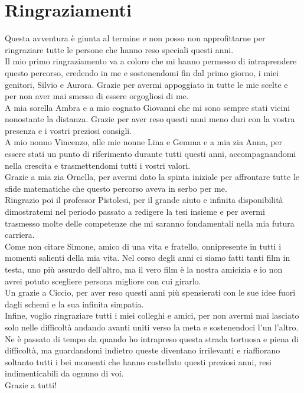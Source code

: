 \documentclass[a4paper,11pt]{article}
\begin{document}
    \section{Ringraziamenti}
    Questa avventura è giunta al termine e non posso non approfittarne per ringraziare tutte le persone che hanno reso speciali questi anni.\\[0.1in]
    Il mio primo ringraziamento va a coloro che mi hanno permesso di intraprendere questo percorso, credendo in me e sostenendomi fin dal primo giorno, i miei genitori, Silvio e Aurora. Grazie per avermi appoggiato in tutte le mie scelte e per non aver mai smesso di essere orgogliosi di me. \\[0.1in]
    A mia sorella Ambra e a mio cognato Giovanni che mi sono sempre stati vicini nonostante la distanza. Grazie per aver reso questi anni meno duri con la vostra presenza e i vostri preziosi consigli.\\[0.1in]
    A mio nonno Vincenzo, alle mie nonne Lina e Gemma e a mia zia Anna, per essere stati un punto di riferimento durante tutti questi anni, accompagnandomi nella crescita e trasmettendomi tutti i vostri valori.\\[0.1in]
    Grazie a mia zia Ornella, per avermi dato la spinta iniziale per affrontare tutte le sfide matematiche che questo percorso aveva in serbo per me.\\[0.1in]
    Ringrazio poi il professor Pistolesi, per il grande aiuto e infinita disponibilità dimostratemi nel periodo passato a redigere la tesi insieme e per avermi trasmesso molte delle competenze che mi saranno fondamentali nella mia futura carriera.\\[0.1in]
    Come non citare Simone, amico di una vita e fratello, onnipresente in tutti i momenti salienti della mia vita. Nel corso degli anni ci siamo fatti tanti film in testa, uno più assurdo dell’altro, ma il vero film è la nostra amicizia e io non avrei potuto scegliere persona migliore con cui girarlo.\\[0.1in]
    Un grazie a Ciccio, per aver reso questi anni più spensierati con le sue idee fuori dagli schemi e la sua infinita simpatia.\\[0.1in]
    Infine, voglio ringraziare tutti i miei colleghi e amici, per non avermi mai lasciato solo nelle difficoltà andando avanti uniti verso la meta e sostenendoci l’un l’altro.\\[0.1in]
    Ne è passato di tempo da quando ho intrapreso questa strada tortuosa e piena di difficoltà, ma guardandomi indietro queste diventano irrilevanti e riaffiorano soltanto tutti i bei momenti che hanno costellato questi preziosi anni, resi indimenticabili da ognuno di voi.\\[0.1in]
    Grazie a tutti!
    
\end{document}
